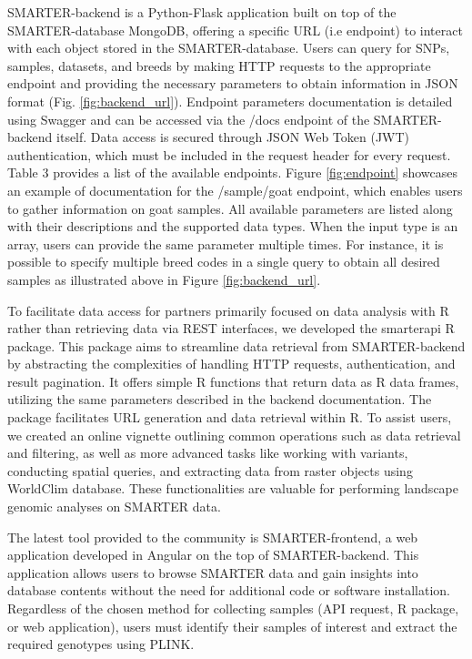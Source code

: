 \documentclass[a4paper,num-refs,gigabyte]{oup-contemporary}
\begin{document}
SMARTER-backend is a Python-Flask application built on top of the SMARTER-database MongoDB, offering a specific URL (i.e endpoint) to interact with each object stored in the SMARTER-database. Users can query for SNPs, samples, datasets, and breeds by making HTTP requests to the appropriate endpoint and providing the necessary parameters to obtain information in JSON format (Fig. \ref{fig:backend_url}).
Endpoint parameters documentation is detailed using Swagger and can be accessed via the /docs endpoint of the SMARTER-backend itself. Data access is secured through JSON Web Token (JWT) authentication\citep{JWT}, which must be included in the request header for every request. Table 3 provides a list of the available endpoints.
Figure \ref{fig:endpoint} showcases an example of documentation for the /sample/goat endpoint, which enables users to gather information on goat samples. All available parameters are listed along with their descriptions and the supported data types. When the input type is an array, users can provide the same parameter multiple times. For instance, it is possible to specify multiple breed codes in a single query to obtain all desired samples as illustrated above in Figure \ref{fig:backend_url}.

To facilitate data access for partners primarily focused on data analysis with R rather than retrieving data via REST interfaces, we developed the smarterapi R package\citep{RSMARTERAPI}. This package aims to streamline data retrieval from SMARTER-backend by abstracting the complexities of handling HTTP requests, authentication, and result pagination. It offers simple R functions that return data as R data frames, utilizing the same parameters described in the backend documentation. The package facilitates URL generation and data retrieval within R.
To assist users, we created an online vignette outlining common operations such as data retrieval and filtering, as well as more advanced tasks like working with variants, conducting spatial queries, and extracting data from raster objects using WorldClim database\citep{Fick2017}. These functionalities are valuable for performing landscape genomic analyses on SMARTER data.

The latest tool provided to the community is SMARTER-frontend\citep{SMARTERfrontend}, a web application developed in Angular\citep{Angular} on the top of SMARTER-backend. This application allows users to browse SMARTER data and gain insights into database contents without the need for additional code or software installation. Regardless of the chosen method for collecting samples (API request, R package, or web application), users must identify their samples of interest and extract the required genotypes using PLINK.
\end{document}
